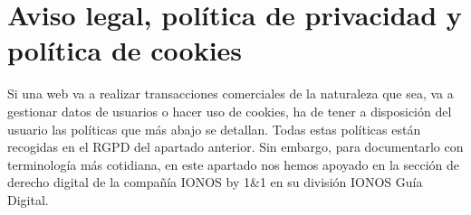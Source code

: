 \documentclass[
  spanish,
  a4paper,
  openany]{book}
\begin{document}
\hypertarget{aviso-legal-poluxedtica-de-privacidad-y-poluxedtica-de-cookies}{%
\section{Aviso legal, política de privacidad y política de cookies}\label{aviso-legal-poluxedtica-de-privacidad-y-poluxedtica-de-cookies}}

Si una web va a realizar transacciones comerciales de la naturaleza que sea, va a gestionar datos de usuarios o hacer uso de cookies, ha de tener a disposición del usuario las políticas que más abajo se detallan. Todas estas políticas están recogidas en el RGPD del apartado anterior. Sin embargo, para documentarlo con terminología más cotidiana, en este apartado nos hemos apoyado en la sección de derecho digital de la compañía IONOS by 1\&1 en su división IONOS Guía Digital.
\end{document}
